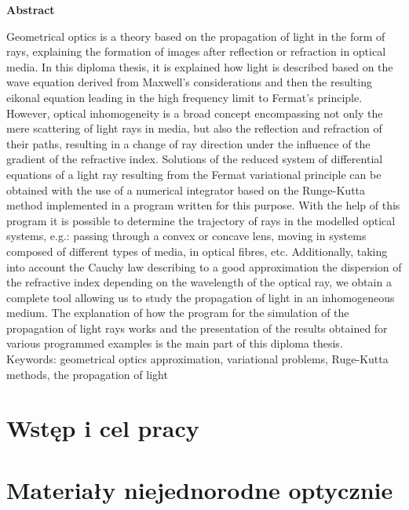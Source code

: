 \documentclass[a4paper,12pkt]{report}
\begin{document}
\begin{center}
{\bf Abstract}
\end{center}
Geometrical optics is a theory based on the propagation of light in the form of rays, explaining the formation of images after reflection or refraction in optical media. In this diploma thesis, it is explained how light is described based on the wave equation derived from Maxwell's considerations and then the resulting eikonal equation leading in the high frequency limit to Fermat's principle. However, optical inhomogeneity is a broad concept encompassing not only the mere scattering of light rays in media, but also the reflection and refraction of their paths, resulting in a change of ray direction under the influence of the  gradient of the refractive index.  Solutions of the reduced system of differential equations of a light ray resulting from the Fermat variational principle can be obtained with the use of a numerical integrator based on the Runge-Kutta method implemented in a program written for this purpose. With the help of this program it is possible to determine the trajectory of rays in the modelled optical systems, e.g.: passing through a convex or concave lens, moving in systems composed of different types of media, in optical fibres, etc. Additionally, taking into account the Cauchy law describing to a good approximation the dispersion of the refractive index depending on the wavelength of the optical ray, we obtain a complete tool allowing us to study the propagation of light in an inhomogeneous medium. The explanation of how the program for the simulation of the propagation of light rays works and the presentation of the results obtained for various programmed examples is the main part of this diploma thesis.\\
Keywords: geometrical optics approximation, variational problems, Ruge-Kutta methods, the propagation
of light
\newpage
{}
\tableofcontents

\newpage
{}

\chapter{Wstęp i cel pracy}



\chapter{Materiały niejednorodne optycznie}
\end{document}
